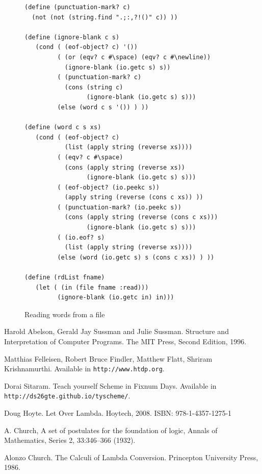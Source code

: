 \documentclass[a4paper,12pt]{book}
\begin{document}
\begin{figure}[!b]
\begin{verbatim}
(define (punctuation-mark? c)
  (not (not (string.find ".;:,?!()" c)) ))

(define (ignore-blank c s)
   (cond ( (eof-object? c) '())
         ( (or (eqv? c #\space) (eqv? c #\newline)) 
           (ignore-blank (io.getc s) s))
         ( (punctuation-mark? c)
           (cons (string c) 
                 (ignore-blank (io.getc s) s)))
         (else (word c s '()) ) )) 

(define (word c s xs)
   (cond ( (eof-object? c)
           (list (apply string (reverse xs))))
         ( (eqv? c #\space)
           (cons (apply string (reverse xs))
                 (ignore-blank (io.getc s) s)))
         ( (eof-object? (io.peekc s))
           (apply string (reverse (cons c xs)) ))
         ( (punctuation-mark? (io.peekc s))
           (cons (apply string (reverse (cons c xs)))
                 (ignore-blank (io.getc s) s)))
         ( (io.eof? s)
           (list (apply string (reverse xs))))
         (else (word (io.getc s) s (cons c xs)) ) ))

(define (rdList fname)
   (let ( (in (file fname :read)))
         (ignore-blank (io.getc in) in)))
\end{verbatim}
\caption{Reading words from a file}
\label{wordsFromFile}
\end{figure}


\begin{thebibliography}{99}


 Harold Abelson, Gerald Jay Sussman and
  Julie Sussman. Structure and Interpretation of
  Computer Programs. The MIT Press, Second Edition, 1996.

 Matthias Felleisen,
  Robert Bruce Findler, Matthew Flatt, Shriram Krishnamurthi.
  Available in \verb|http://www.htdp.org|.

 Dorai Sitaram. Teach yourself Scheme
  in Fixnum Days. Available
  in \verb|http://ds26gte.github.io/tyscheme/|.

 Doug Hoyte. Let Over Lambda. Hoytech, 2008. ISBN: 978-1-4357-1275-1

 A. Church, A set of postulates for the foundation of logic, Annals of Mathematics, Series 2, 33:346–366 (1932).

 Alonzo Church. The Calculi of Lambda Conversion. Princepton University Press, 1986.

\end{thebibliography}

\printindex
\end{document}
